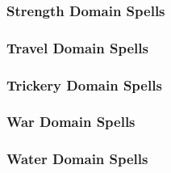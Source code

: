 \subsubsection{Strength Domain Spells}

\begin{spelllist}
    \SLlongstrider[1]
    \SLenlarge[2]
    \SLmightythrow[3]
    \SLshout[4]
    \SLdivinemight[5]
    \SLseismicslam[6]
    \SLgolemheart[7]
    \SLavatarofmight[8]
    \SLearthquake[9]
\end{spelllist}

\subsubsection{Travel Domain Spells}

\begin{spelllist}
    \SLlongstrider[1]
    \SLdimensionslide[2]
    \SLgaseousform[3]
    \SLairwalk[4]
    \SLshadowstep[5]
    \SLwordofrecall[6]
    \SLavataroftranslocation[7]
    \SLimprisonment[8]
    \SLdimensionalarmy[9]
\end{spelllist}

\subsubsection{Trickery Domain Spells}

\begin{spelllist}
    \SLmaskofthedeceiver[1]
    \SLcreateimage[2]
    \SLinvisibility[3]
    \SLconfusion[4]
    \SLshadowstep[5]
    \SLshadowwall[6]
    \SLshadowstorm[7]
    \SLmaze[8]
    \SLshadowshield[9]
\end{spelllist}

\subsubsection{War Domain Spells}

\begin{spelllist}
    \SLearthenblade[1]
    \SLflameblade[2]
    \SLaqueousblade[3]
    \SLbladebarrier[4]
    \SLmartialtransformation[5]
    \SLblessedblade[6]
    \SLavatarofshielding[7]
    \SLbladestorm[8]
    \SLavatarofblades[9]
\end{spelllist}

\subsubsection{Water Domain Spells}

